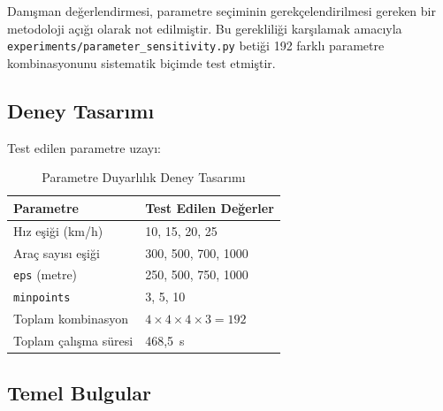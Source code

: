 \documentclass[12pt,a4paper]{article}
\begin{document}
Danışman değerlendirmesi, parametre seçiminin gerekçelendirilmesi gereken bir metodoloji açığı olarak not edilmiştir. Bu gerekliliği karşılamak amacıyla \texttt{experiments/parameter\_sensitivity.py} betiği 192 farklı parametre kombinasyonunu sistematik biçimde test etmiştir.

\subsection{Deney Tasarımı}

Test edilen parametre uzayı:

\begin{table}[H]
\centering
\caption{Parametre Duyarlılık Deney Tasarımı}
\label{tab:sensitivity-grid}
\begin{tabular}{l l}
\toprule
\textbf{Parametre} & \textbf{Test Edilen Değerler} \\
\midrule
Hız eşiği (km/h)       & 10, 15, 20, 25 \\
Araç sayısı eşiği      & 300, 500, 700, 1000 \\
\texttt{eps} (metre)   & 250, 500, 750, 1000 \\
\texttt{minpoints}     & 3, 5, 10 \\
\midrule
Toplam kombinasyon & $4 \times 4 \times 4 \times 3 = 192$ \\
Toplam çalışma süresi & 468,5~s \\
\bottomrule
\end{tabular}
\end{table}

\subsection{Temel Bulgular}
\end{document}
